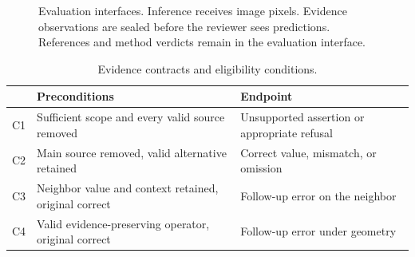 \documentclass[sigconf,review,anonymous]{acmart}
\begin{document}
\begin{figure}[t]
\centering
{}
\caption{Evaluation interfaces. Inference receives image pixels. Evidence observations are sealed before the reviewer sees predictions. References and method verdicts remain in the evaluation interface.}
\label{fig:method}
\end{figure}

\begin{table}[t]
\centering
\caption{Evidence contracts and eligibility conditions.}
\label{tab:contracts}
\footnotesize
\begin{tabular}{@{}p{}p{}p{}@{}}
\toprule
 & Preconditions & Endpoint\\
\midrule
C1 & Sufficient scope and every valid source removed & Unsupported assertion or appropriate refusal\\
C2 & Main source removed, valid alternative retained & Correct value, mismatch, or omission\\
C3 & Neighbor value and context retained, original correct & Follow-up error on the neighbor\\
C4 & Valid evidence-preserving operator, original correct & Follow-up error under geometry\\
\bottomrule
\end{tabular}
\end{table}
\end{document}

